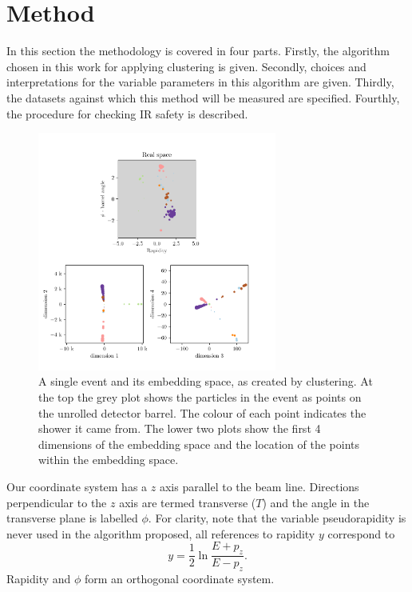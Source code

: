 \section{Method}
In this section the methodology is covered in four parts.
Firstly, the algorithm chosen in this work for applying \spectral{} clustering  is given.
Secondly, choices and interpretations for the variable parameters in this algorithm are given.
Thirdly,  the datasets against which this method will be measured are specified.
Fourthly, the procedure for checking IR safety is described.

    \begin{figure}[!t]
        \center
        \includegraphics[width=0.7\textwidth]{graphics/embedding_space_simple2.pdf}
        \caption{A single event and its embedding space, as created by \spectral{} clustering.
            At the top the grey plot shows the particles in the event as points on the unrolled detector barrel.
            The colour of each point indicates the shower it came from.
            The lower two plots show the first 4 dimensions of the embedding space
            and the location of the points within the embedding space.}\label{fig:embedding_space_simple}
    \end{figure}    

Our coordinate system has a \(z\) axis parallel to the beam line.
Directions perpendicular to the \(z\) axis are termed transverse (\(T\)) and
the angle in the transverse plane is labelled \(\phi\).
For clarity, note that the variable pseudorapidity is never used
in the algorithm proposed, all references to rapidity $y$ correspond to
\begin{equation}\label{eqn:rapidity}
    y = \frac{1}{2} \ln\frac{E + p_z}{E - p_z}.
\end{equation}
Rapidity and \(\phi\) form an orthogonal coordinate system.

